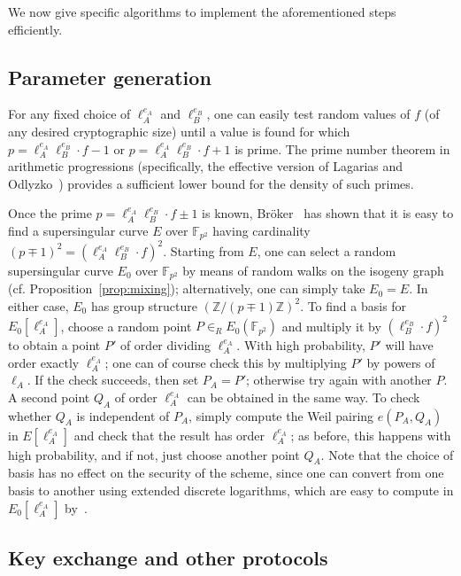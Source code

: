 \documentclass[jmc]{degruyter-journal-a}
\theoremstyle{definition}
\newcommand{\ZZ}{{\mathbb{Z}}}
\newcommand{\FF}{{\mathbb{F}}}
\begin{document}
We now give specific algorithms to implement the aforementioned steps
efficiently. 

\subsection{Parameter generation}\label{subsec:parameter}

For any fixed choice of $\ell_A^{e_A}$ and $\ell_B^{e_B}$, one can
easily test random values of $f$ (of any desired cryptographic size)
until a value is found for which $p=\ell_A^{e_A} \ell_B^{e_B}\cdot f -
1$ or $p=\ell_A^{e_A} \ell_B^{e_B}\cdot f + 1$ is prime. The prime
number theorem in arithmetic progressions (specifically, the effective
version of Lagarias and Odlyzko~\cite{lo}) provides a sufficient lower
bound for the density of such primes. 

Once the prime $p= \ell_A^{e_A} \ell_B^{e_B}\cdot f \pm 1$ is known,
Br\"oker~\cite{broker-ss} has shown that it is easy to find a
supersingular curve $E$ over $\FF_{p^2}$ having cardinality $(p\mp
1)^2 = (\ell_A^{e_A} \ell_B^{e_B}\cdot f)^2$. Starting from $E$, one
can select a random supersingular curve $E_0$ over $\FF_{p^2}$ by
means of random walks on the isogeny graph
(cf. Proposition~\ref{prop:mixing});
alternatively, one can simply take $E_0 = E$. In either case, $E_0$
has group structure $(\ZZ/(p\mp 1)\ZZ)^2$. To find a basis for
$E_0[\ell_A^{e_A}]$, choose a random point $P \in_R E_0(\FF_{p^2})$
and multiply it by $(\ell_B^{e_B}\cdot f)^2$ to obtain a point $P'$ of
order dividing $\ell_A^{e_A}$. With high probability, $P'$ will have
order exactly $\ell_A^{e_A}$; one can of course check this by
multiplying $P'$ by powers of $\ell_A$. If the check succeeds, then
set $P_A = P'$; otherwise try again with another $P$. A second point
$Q_A$ of order $\ell_A^{e_A}$ can be obtained in the same way.  To
check whether $Q_A$ is independent of $P_A$, simply compute the Weil
pairing $e(P_A,Q_A)$ in $E[\ell_A^{e_A}]$ and check that the result
has order $\ell_A^{e_A}$; as before, this happens with high
probability, and if not, just choose another point $Q_A$. Note that
the choice of basis has no effect on the security of the scheme, since
one can convert from one basis to another using extended discrete
logarithms, which are easy to compute in $E_0[\ell_A^{e_A}]$
by~\cite{teske-ph}.

\subsection{Key exchange and other protocols}\label{subsec:kea}
\end{document}
